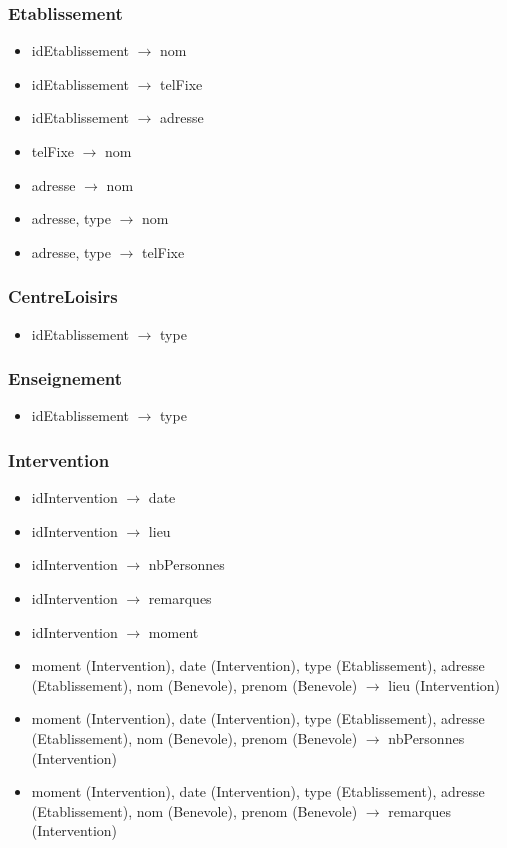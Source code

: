 \subsubsection*{Etablissement}
\begin{itemize}
\item[] idEtablissement $\rightarrow$ nom 
\item[] idEtablissement $\rightarrow$ telFixe
\item[] idEtablissement $\rightarrow$ adresse
\item[] telFixe $\rightarrow$ nom
\item[] adresse $\rightarrow$ nom
\item[] adresse, type $\rightarrow$ nom
\item[] adresse, type $\rightarrow$ telFixe
\end{itemize}

\subsubsection*{CentreLoisirs}
\begin{itemize}
\item[]	idEtablissement $\rightarrow$ type
\end{itemize}

\subsubsection*{Enseignement}
\begin{itemize}
\item[]	idEtablissement $\rightarrow$ type
\end{itemize}

\subsubsection*{Intervention}
\begin{itemize}
\item[]	idIntervention $\rightarrow$ date
\item[]	idIntervention $\rightarrow$ lieu
\item[]	idIntervention $\rightarrow$ nbPersonnes
\item[]	idIntervention $\rightarrow$ remarques
\item[]	idIntervention $\rightarrow$ moment
\item[] moment (Intervention), date (Intervention), type (Etablissement), adresse (Etablissement), nom (Benevole), prenom (Benevole) $\rightarrow$ lieu (Intervention)
\item[] moment (Intervention), date (Intervention), type (Etablissement), adresse (Etablissement), nom (Benevole), prenom (Benevole) $\rightarrow$ nbPersonnes (Intervention)
\item[] moment (Intervention), date (Intervention), type (Etablissement), adresse (Etablissement), nom (Benevole), prenom (Benevole) $\rightarrow$ remarques (Intervention)
\end{itemize}

